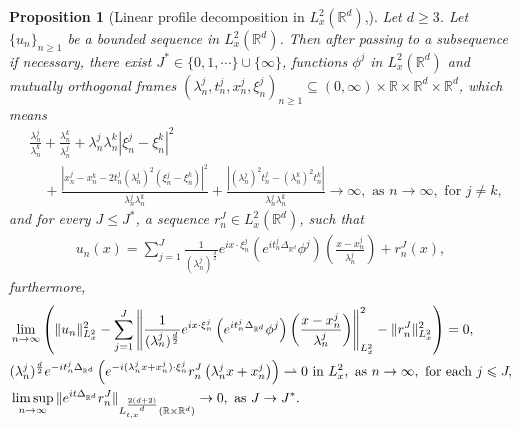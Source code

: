 \documentclass[reqno,11pt]{amsart}
\theoremstyle{plain}
\newtheorem{proposition}[theorem]{Proposition}
\theoremstyle{definition}
\numberwithin{equation}{section}
\numberwithin{theorem}{section}
\def\ge{\geqslant}
\def\le{\leqslant}
\def\geq{\geqslant}
\def\R{\mathbb{R}}
\begin{document}
\begin{proposition}[Linear profile decomposition in $L_x^2 ( \mathbb{R}^d)$,\cite{MV}] \label{pro3.9v23} Let $d\geq3$. Let $\{u_n\}_{n\ge 1}$ 
be a bounded sequence in $L_x^2 (\mathbb{R}^d)$. Then after passing to a subsequence if necessary,
there exist $J^* \in \{0,1, \cdots\} \cup \{\infty\}$,
functions $\phi^{j}$ in $L_x^2(\mathbb{R}^d)$ and mutually orthogonal frames $(\lambda_n^j, t_n^j, x_n^j,\xi_n^j )_{n\ge 1} \subseteq (0,\infty) \times \mathbb{R} \times \mathbb{R}^d \times \mathbb{R}^d$,
which means
\begin{align*}
&\frac{\lambda_n^j}{\lambda_n^k} + \frac{\lambda_n^k}{\lambda_n^j}
+ \lambda_n^j \lambda_n^{k} |\xi_n^j - \xi_n^{k}|^2 \\
&\quad+ \frac{\left|x_n^j-x_n^k-2t_n^j(\lambda_n^j)^2(\xi_n^j-\xi_n^k)\right|^2}{\lambda_n^j\lambda_n^k}
+ \frac{|(\lambda_n^j)^2 t_n^j - (\lambda_n^k)^2 t_n^k |}{\lambda_n^j \lambda_n^k}
\to \infty, \text{ as } n \to \infty, \text{ for } j\ne k,
\end{align*}
and for every $J \le J^*$, a sequence $r_n^J \in L_x^2  (\mathbb{R}^d)$, such that
\begin{align*}
u_n(x)  = \sum\limits_{j=1}^J \frac1{(\lambda_n^j)^{\frac{d}{2}}} e^{ix\cdot\xi_n^j} \left(e^{it_n^j\Delta_{\R^d}} \phi^j\right)\left(\frac{x-x_n^j}{\lambda_n^j} \right)  +r_n^J(x),
\end{align*}
furthermore, 
\begin{align*}
& \lim\limits_{n\to \infty} \left(\|u_n\|_{L_x^2 }^2 - \sum\limits_{j=1}^J \left\|   \frac1{(\lambda_n^j)^{\frac{d}{2}}} e^{ix\cdot\xi_n^j} \left(e^{it_n^j\Delta_{\R^d  }} \phi^j\right)\left(\frac{x-x_n^j}{\lambda_n^j}\right)
\right\|_{ L_x^2}^2 - \| r_n^J\|^2_{L_x^2}  \right)  = 0, \notag \\
& (\lambda_n^j)^{\frac{d}{2}}   e^{-it_n^j \Delta_{\R^d  }}\left(e^{-i(\lambda_n^j x + x_n^j)\cdot \xi_n^j} r_n^J\left(\lambda_n^j x+ x_n^j \right)\right)  \rightharpoonup 0 \text{ in } L_x^2 ,  \text{ as  } n\to \infty,\text{ for each }  j\le J,\notag\\
&  \limsup\limits_{n\to \infty} \|e^{it \Delta_{\R^d    }} r_n^{J} \|_{L_{t,x}^{\frac{2(d+2)}{d}}(\mathbb{R}\times \mathbb{R}^d)}   \to 0, \text{ as } J\to J^*.
\end{align*}
\end{proposition}
\end{document}
